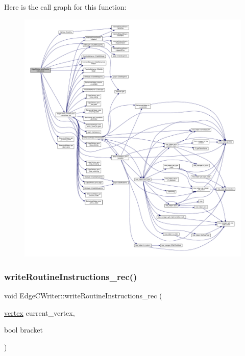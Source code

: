 Here is the call graph for this function\+:
\nopagebreak
\begin{figure}[H]
\begin{center}
\leavevmode
\includegraphics[width=350pt]{d7/dee/classEdgeCWriter_a26e88f61025b2993b8608ef28951cb9f_cgraph}
\end{center}
\end{figure}
\mbox{\label{classEdgeCWriter_a8bd9dbf867c6937dd51d309ef4f27073}} 
\subsubsection{\texorpdfstring{write\+Routine\+Instructions\+\_\+rec()}{writeRoutineInstructions\_rec()}}
{\footnotesize\ttfamily void Edge\+C\+Writer\+::write\+Routine\+Instructions\+\_\+rec (\begin{DoxyParamCaption}\item[{\hyperlink{graph_8hpp_abefdcf0544e601805af44eca032cca14}{vertex}}]{current\+\_\+vertex,  }\item[{bool}]{bracket }\end{DoxyParamCaption})\hspace{0.3cm}{\ttfamily [protected]}}



